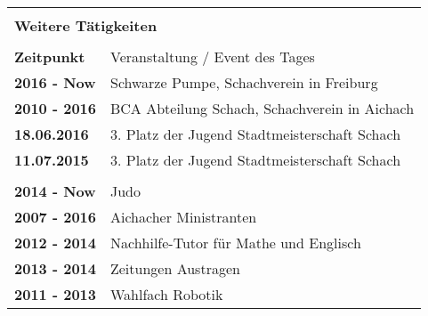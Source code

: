 \documentclass{scrartcl}
\begin{document}
\begin{tabular}{|l|l|}
    \multicolumn{2}{l}{} \\
    \multicolumn{2}{l}{\LARGE \textbf{Weitere Tätigkeiten}} \\
    \multicolumn{2}{l}{} \\ \hline

    \textbf{Zeitpunkt} & Veranstaltung / Event des Tages \\ \hline


    \textbf{2016 - Now } & Schwarze Pumpe, Schachverein in Freiburg \\ \hline
    \textbf{2010 - 2016} & BCA Abteilung Schach, Schachverein in Aichach \\ \hline
    \textbf{18.06.2016} & 3. Platz der Jugend Stadtmeisterschaft Schach \\ \hline
    \textbf{11.07.2015} & 3. Platz der Jugend Stadtmeisterschaft Schach \\ \hline

    \multicolumn{2}{|l|}{} \\ \hline

    \textbf{2014 - Now } & Judo \\ \hline
    \textbf{2007 - 2016} & Aichacher Ministranten \\ \hline
    \textbf{2012 - 2014} & Nachhilfe-Tutor für Mathe und Englisch \\ \hline
    \textbf{2013 - 2014} & Zeitungen Austragen \\ \hline
    \textbf{2011 - 2013} & Wahlfach Robotik \\ \hline

\end{tabular}
\end{document}
